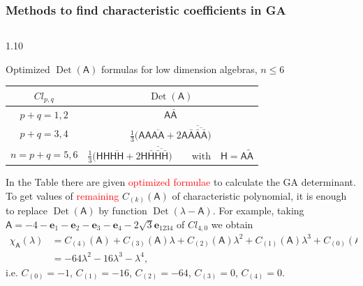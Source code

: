 \documentclass[xcolor=table,hyperref={pdfpagemode=FullScreen}]{beamer}
\newcommand{\cl}[2]{\ensuremath{\mathit{Cl}_{#1,#2}}} %
\newcommand{\e}[1]{\mathbf{e}_{#1}} %
\def\m#1{\mathsf{#1}} %
\newcommand{\reverse}[1]{\widetilde{#1}}
\def\m#1{\mathsf{#1}}%
\DeclareMathOperator{\Det}{Det} %
\newcommand{\red}[1]{\textcolor{red}{#1}}
\begin{document}
\begin{frame}
\frametitle<presentation>{Methods to find characteristic coefficients in GA}
\vskip -18pt
\begin{columns}[t]
\begin{column}{1.10\textwidth}
  \begin{block}{Optimized $\Det(\m{A})$ formulas for low dimension algebras, $n\le 6$}
 \begin{table}
\begin{center}
  \begin{tabular}{cc}
    $\cl{p}{q}$& $\Det(\m{A})$ \\\hline
\rule{0pt}{3ex}
$p+q=1,2$&$\m{A}\bar{\m{A}}$\\
$p+q=3,4$ &$
    \frac{1}{3}\bigl(\m{A}\m{A} \overline{\m{A}\m{A}}+2 \m{A}\overline{\bar{\m{A}}\overline{\bar{\m{A}}\bar{\m{A}}}} \bigr)$
\\
$n=p+q=5,6$ &$
    \frac{1}{3}\bigl(\m{H}\m{H} \overline{\m{H}\m{H}}+2 \m{H}\overline{\bar{\m{H}}\overline{\bar{\m{H}}\bar{\m{H}}}} \bigr)\qquad\textrm{with}\quad \m{H}=\m{A}\reverse{\m{A}}$
\end{tabular}
\end{center}
\end{table}
   In the Table there are given  \red{optimized formulae}   to calculate the GA determinant. 
   To get values of \red{remaining} 
   $C_{(k)}(\m{A})$ of characteristic  
  polynomial, it is enough to replace $\Det(\m{A})$ by function 
   $\Det(\lambda-\m{A})$. 
 For example, taking $\m{A}=-4-\e{1}-\e{2}-\e{3}-\e{4}-2 \sqrt{3} \e{1234}$ of $\cl{4}{0}$ we obtain 
\abovedisplayskip=10pt
\belowdisplayskip=8pt
 \begin{equation*}
 \begin{split}
   \chi_{\m{A}}(\lambda)&=C_{(4)}(\m{A})+C_{(3)}(\m{A})
\lambda+C_{(2)}(\m{A})\lambda^2+C_{(1)}(\m{A})
   \lambda^3+C_{(0)}(\m{A})\lambda^4\\
   &
 = -64 \lambda^2-16 \lambda^3-\lambda^4,
\end{split}
 \end{equation*}
    i.e. $C_{(0)}=-1$, $C_{(1)}=-16$, $C_{(2)}=-64$, $C_{(3)}=0$, $C_{(4)}=0$.
\end{block}
\end{column}
\end{columns}
\end{frame}
\end{document}
